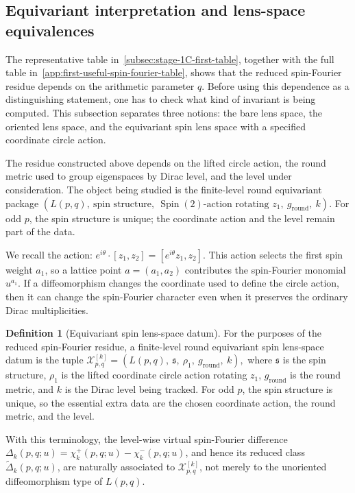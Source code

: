 \documentclass{article}
\theoremstyle{definition}
\newtheorem{definition}[theorem]{Definition}
\numberwithin{equation}{section}
\begin{document}
\subsection{Equivariant interpretation and lens-space equivalences}
\label{subsec:stage-1D-equivariant-interpretation}

The representative table in~\autoref{subsec:stage-1C-first-table}, together with the full table in~\autoref{app:first-useful-spin-fourier-table}, shows that the reduced spin-Fourier residue depends on the arithmetic parameter $q$.  Before using this dependence as a distinguishing statement, one has to check what kind of invariant is being computed.  This subsection separates three notions: the bare lens space, the oriented lens space, and the equivariant spin lens space with a specified coordinate circle action.

The residue constructed above depends on the lifted circle action, the round metric used to group eigenspaces by Dirac level, and the level under consideration.  The object being studied is the finite-level round equivariant package $\left(L(p,q),\ \text{spin structure},\ \operatorname{Spin}(2)\text{-action rotating }z_1,\ g_{\text{round}},\ k\right).$ For odd $p$, the spin structure is unique; the coordinate action and the level remain part of the data.

We recall the action: $e^{i\theta}\cdot[z_1,z_2]=[e^{i\theta}z_1,z_2].$ This action selects the first spin weight $a_1$, so a lattice point $a=(a_1,a_2)$ contributes the spin-Fourier monomial $u^{a_1}.$ If a diffeomorphism changes the coordinate used to define the circle action, then it can change the spin-Fourier character even when it preserves the ordinary Dirac multiplicities.

\begin{definition}[Equivariant spin lens-space datum]
For the purposes of the reduced spin-Fourier residue, a finite-level round equivariant spin lens-space datum is the tuple $\mathcal X^{[k]}_{p,q}=\left(L(p,q),\ \mathfrak s,\ \rho_1,\ g_{\text{round}},\ k\right),$ where $\mathfrak s$ is the spin structure, $\rho_1$ is the lifted coordinate circle action rotating $z_1$, $g_{\text{round}}$ is the round metric, and $k$ is the Dirac level being tracked.  For odd $p$, the spin structure is unique, so the essential extra data are the chosen coordinate action, the round metric, and the level.
\end{definition}

With this terminology, the level-wise virtual spin-Fourier difference $\Delta_k(p,q;u)=\chi_k^+(p,q;u)-\chi_k^-(p,q;u)$, and hence its reduced class $\widetilde\Delta_k(p,q;u)$, are naturally associated to $\mathcal X^{[k]}_{p,q}$, not merely to the unoriented diffeomorphism type of $L(p,q)$.
\end{document}
